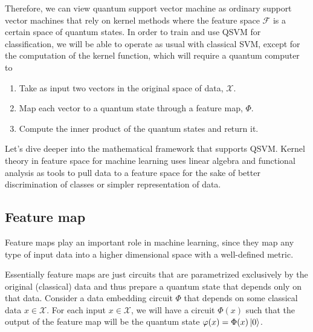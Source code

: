 Therefore, we can view quantum support vector machine as ordinary support vector machines that rely on kernel methods where the feature space $\mathcal{F}$ is a certain space of quantum states. In order to train and use QSVM for classification, we will be able to operate as usual with classical SVM, except for the computation of the kernel function, which will require a quantum computer to
\begin{enumerate}
    \item Take as input two vectors in the original space of data, $\mathcal{X}$.
    \item Map each vector to a quantum state through a feature map, $\Phi$.
    \item Compute the inner product of the  quantum states and return it.
\end{enumerate}

Let's dive deeper into the mathematical framework that supports QSVM.
Kernel theory in feature space for machine learning uses linear algebra and functional analysis as tools to  pull data to a feature space for the sake of better discrimination of classes or simpler representation of data. 

\subsection{Feature map}\label{subsec: feature map}
Feature maps play an important role in machine learning, since they map any type of input data into a higher dimensional space with a well-defined metric. 

Essentially feature maps are just circuits that are parametrized exclusively by the original (classical) data and thus prepare a quantum state that depends only on that data. Consider a data embedding circuit $\Phi$ that depends on some classical data $x \in \mathcal{X}$. For each input $x \in \mathcal{X}$, we will have a circuit $\Phi(x)$ such that the output of the feature map will be the quantum state $\varphi(x)=\Phi(x) \ket 0$. 


